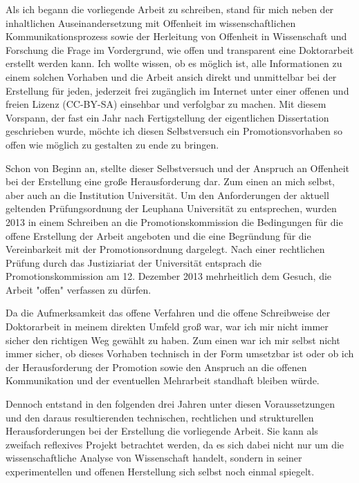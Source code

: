 \begin{vorspann}
Als ich begann die vorliegende Arbeit zu schreiben, stand für mich neben der inhaltlichen Auseinandersetzung mit Offenheit im wissenschaftlichen Kommunikationsprozess sowie der Herleitung von Offenheit in Wissenschaft und Forschung die Frage im Vordergrund, wie offen und transparent eine Doktorarbeit erstellt werden kann. Ich wollte wissen, ob  es möglich ist, alle Informationen zu einem solchen Vorhaben und die Arbeit ansich direkt und unmittelbar bei der Erstellung für jeden, jederzeit frei zugänglich im Internet unter einer offenen und freien Lizenz (CC-BY-SA) einsehbar und verfolgbar zu machen. Mit diesem Vorspann, der fast ein Jahr nach Fertigstellung der eigentlichen Dissertation geschrieben wurde, möchte ich diesen Selbstversuch ein Promotionsvorhaben so offen wie möglich zu gestalten zu ende zu bringen.

Schon von Beginn an, stellte dieser Selbstversuch und der Anspruch an Offenheit bei der Erstellung eine große Herausforderung dar. Zum einen an mich selbst, aber auch an die Institution Universität. Um den Anforderungen der aktuell geltenden Prüfungsordnung der Leuphana Universität zu entsprechen, wurden 2013 in einem Schreiben an die Promotionskommission die Bedingungen für die offene Erstellung der Arbeit angeboten und die eine Begründung für die Vereinbarkeit mit der Promotionsordnung dargelegt. Nach einer rechtlichen Prüfung durch das Justiziariat der Universität entsprach die Promotionskommission am 12. Dezember 2013 mehrheitlich dem Gesuch, die Arbeit "offen" verfassen zu dürfen.

Da die Aufmerksamkeit das offene Verfahren und die offene Schreibweise der Doktorarbeit in meinem direkten Umfeld groß war, war ich mir nicht immer sicher den richtigen Weg gewählt zu haben. Zum einen war ich mir selbst nicht immer sicher, ob dieses Vorhaben technisch in der Form umsetzbar ist oder ob ich der Herausforderung der Promotion sowie den Anspruch an die offenen Kommunikation und der eventuellen Mehrarbeit standhaft bleiben würde.

Dennoch entstand in den folgenden drei Jahren unter diesen Voraussetzungen und den daraus resultierenden technischen, rechtlichen und strukturellen Herausforderungen bei der Erstellung die vorliegende Arbeit. Sie kann als zweifach reflexives Projekt betrachtet werden, da es sich dabei nicht nur um die wissenschaftliche Analyse von Wissenschaft handelt, sondern in seiner experimentellen und offenen Herstellung sich selbst noch einmal spiegelt.


\end{vorspann}
